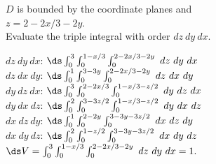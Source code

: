 {\label{13_06_ex_07}$D$ is bounded by the coordinate planes and\\
 $z=2-2x/3-2y$.\\

Evaluate the triple integral with order $dz\ dy\ dx$.

}
{$dz\ dy\ dx$: $\ds\int_0^3\int_0^{1-x/3}\int_0^{2-2x/3-2y}\ dz\ dy\ dx$\\
	$dz\ dx\ dy$: $\ds\int_0^1\int_0^{3-3y}\int_0^{2-2x/3-2y}\ dz\ dx\ dy$\\
	$dy\ dz\ dx$: $\ds\int_0^3\int_0^{2-2x/3}\int_0^{1-x/3-z/2}\ dy\ dz\ dx$\\
	$dy\ dx\ dz$: $\ds\int_0^2\int_0^{3-3z/2}\int_0^{1-x/3-z/2}\ dy\ dx\ dz$\\
	$dx\ dz\ dy$: $\ds\int_0^1\int_0^{2-2y}\int_0^{3-3y-3z/2}\ dx\ dz\ dy$\\
	$dx\ dy\ dz$: $\ds\int_0^2\int_0^{1-z/2}\int_0^{3-3y-3z/2}\ dx\ dy\ dz$\\
	
	$\ds V = \int_0^3\int_0^{1-x/3}\int_0^{2-2x/3-2y}\ dz\ dy\ dx =1.$ 
}
